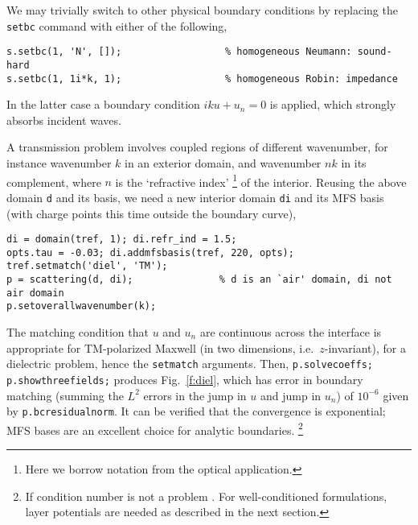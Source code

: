 We may trivially switch to other physical boundary conditions by replacing
the {\tt setbc} command with either of the following,
\begin{verbatim}
s.setbc(1, 'N', []);                  % homogeneous Neumann: sound-hard
s.setbc(1, 1i*k, 1);                  % homogeneous Robin: impedance
\end{verbatim}
In the latter case a boundary condition $iku + u_n=0$ is applied, which
strongly absorbs incident waves.

\bfi %
\efi

A transmission problem involves coupled regions of different wavenumber,
for instance wavenumber $k$ in an exterior domain, and wavenumber $nk$ in
its complement, where $n$ is the `refractive index'%
  \footnote{Here we borrow notation from the optical application.}
of the interior.
Reusing the above domain {\tt d} and its basis, we need a new interior domain
{\tt di}
and its MFS basis (with charge points this time outside the boundary curve),
\begin{verbatim}
di = domain(tref, 1); di.refr_ind = 1.5;
opts.tau = -0.03; di.addmfsbasis(tref, 220, opts);
tref.setmatch('diel', 'TM');
p = scattering(d, di);               % d is an `air' domain, di not air domain
p.setoverallwavenumber(k);
\end{verbatim}
The matching condition that $u$ and $u_n$ are continuous across the interface
is appropriate for TM-polarized Maxwell (in two dimensions, i.e.\
$z$-invariant), for a dielectric problem, hence the {\tt setmatch}
arguments.
Then, {\tt p.solvecoeffs; p.showthreefields;} produces
Fig.~\ref{f:diel}, which has error in boundary matching
(summing the $L^2$ errors in the jump in $u$ and jump in $u_n$)
of $10^{-6}$ given by {\tt p.bcresidualnorm}.
It can be verified that the convergence is exponential; MFS bases are an
excellent choice for analytic boundaries.%
  \footnote{If condition number is not a problem \cite{mfs}.
    For well-conditioned
    formulations, layer potentials are needed as described in the next
    section.}

